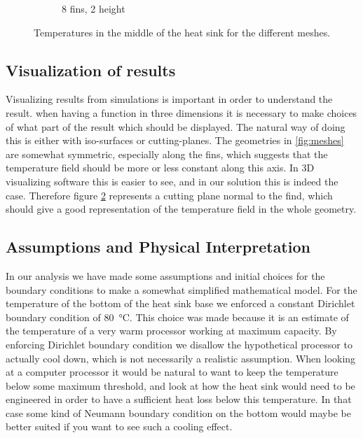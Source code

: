 \begin{figure}[h]
\begin{subfigure}[t] {0.23\textwidth}
 \caption{8 fins, 2 height}
 \label{fig:mesh_temps_res_8_2}
 \end{subfigure}
 \caption{Temperatures in the middle of the heat sink for the different meshes.}
 \label{fig:mesh_temps}
 \end{figure}
 
\subsection{Visualization of results}
Visualizing results from simulations is important in order to understand the result. when having a function in three dimensions it is necessary to make choices of what part of the result which should be displayed. The natural way of doing this is either with iso-surfaces or cutting-planes. The geometries in \ref{fig:meshes} are somewhat symmetric, especially along the fins, which suggests that the temperature field should be more or less constant along this axis. In 3D visualizing software this is easier to see, and in our solution this is indeed the case. Therefore figure \ref{fig:mesh_temps} represents a cutting plane normal to the find, which should give a good representation of the temperature field in the whole geometry.

\subsection{Assumptions and Physical Interpretation}
In our analysis we have made some assumptions and initial choices for the boundary conditions to make a somewhat simplified mathematical model. For the temperature of the bottom of the heat sink base we enforced a constant Dirichlet boundary condition of \SI{80}{\celsius}. This choice was made because it is an estimate of the temperature of a very warm processor working at maximum capacity. By enforcing Dirichlet boundary condition we disallow the hypothetical processor to actually cool down, which is not necessarily a realistic assumption. When looking at a computer processor it would be natural to want to keep the temperature below some maximum threshold, and look at how the heat sink would need to be engineered in order to have a sufficient heat loss below this temperature. In that case some kind of Neumann boundary condition on the bottom would  maybe be better suited if you want to see such a cooling effect.

